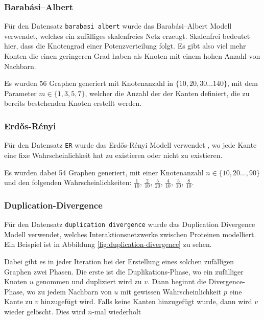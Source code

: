 \documentclass[12pt,a4paper,onecolumn,oneside,titlepage]{article}
\newcommand{\vars}{\texttt}
\begin{document}
\subsubsection{Barabási–Albert}
Für den Datensatz \vars{barabasi albert} wurde das Barabási–Albert Modell verwendet, welches ein zufälliges skalenfreies Netz erzeugt\cite{Albert02}.
Skalenfrei bedeutet hier, dass die Knotengrad einer Potenzverteilung folgt. Es gibt also viel mehr Konten die einen geringeren Grad haben als Knoten mit einem hohen Anzahl von Nachbarn. 

Es wurden 56 Graphen generiert mit Knotenanzahl in $\{10,20,30…140\}$, mit dem Parameter $m \in \{1,3,5,7\}$, welcher die Anzahl der der Kanten definiert, die zu bereits bestehenden Knoten erstellt werden.
\subsubsection{Erdős-Rényi}
Für den Datensatz \vars{ER} wurde das Erdős-Rényi Modell verwendet\cite{Gilbert59} \cite{Batagelj05}, wo jede Kante eine fixe Wahrscheinlichkeit hat zu existieren oder nicht zu existieren.

Es wurden dabei 54 Graphen generiert, mit einer Knotenanzahl $n \in \{10,20…,90\}$ und den folgenden Wahrscheinlichkeiten: $\frac{1}{10}$, $\frac{2}{10}$, $\frac{5}{20}$, $\frac{4}{10}$, $\frac{5}{10}$, $\frac{8}{10}$.


\subsubsection{Duplication-Divergence}
Für den Datensatz \vars{duplication divergence} wurde das Duplication Divergence Modell verwendet\cite{Ispolatov05}, welches Interaktionsnetzwerke zwischen Proteinen modelliert. Ein Beispiel ist in Abbildung \ref{fig:duplication-divergence} zu sehen.

Dabei gibt es in jeder Iteration bei der Erstellung eines solchen zufälligen Graphen zwei Phasen. Die erste ist die Duplikations-Phase, wo ein zufälliger Knoten $u$ genommen und dupliziert wird zu $v$. Dann beginnt die Divergence-Phase, wo zu jedem Nachbarn von $u$ mit gewissen Wahrscheinlichkeit $p$ eine Kante zu $v$ hinzugefügt wird. Falls keine Kanten hinzugefügt wurde, dann wird $v$ wieder gelöscht. Dies wird $n$-mal wiederholt 
\end{document}

